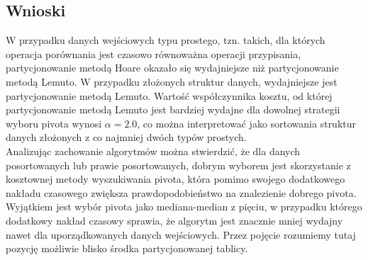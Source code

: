 \begin{figure}[]
	\centering
	
	\caption[]{}
	\label{fig:quick-sort-deterministic-pivot-reversed}
\end{figure}

\begin{figure}[]
	\centering
	
	\caption[]{}
	\label{fig:quick-sort-deterministic-pivot-cost-factor}
\end{figure}

\begin{figure}[]
	\centering
	
	\caption[]{}
	\label{fig:quick-sort-deterministic-pivot-density}
\end{figure}

\begin{figure}[]
	\centering
	
	\caption[]{}
	\label{fig:quick-sort-deterministic-pivot-all}
\end{figure}

\subsection{Wnioski}
W przypadku danych wejściowych typu prostego, tzn. takich, dla których operacja porównania jest czasowo równoważna operacji przypisania, partycjonowanie metodą Hoare okazało się wydajniejsze niż partycjonowanie metodą Lemuto. W przypadku złożonych struktur danych, wydajniejsze jest partycjonowanie metodą Lemuto. Wartość współczynnika kosztu, od której partycjonowanie metodą Lemuto jest bardziej wydajne dla dowolnej strategii wyboru pivota wynosi $\alpha = 2.0$, co można interpretować jako sortowania struktur danych złożonych z co najmniej dwóch typów prostych.\\

Analizując zachowanie algorytmów można stwierdzić, że dla danych posortowanych lub prawie posortowanych, dobrym wyborem jest skorzystanie z kosztownej metody wyszukiwania pivota, która pomimo swojego dodatkowego nakładu czasowego zwiększa prawdopodobieństwo na znalezienie dobrego pivota. Wyjątkiem jest wybór pivota jako mediana-median z pięciu, w przypadku którego dodatkowy nakład czasowy sprawia, że algorytm jest znacznie mniej wydajny nawet dla uporządkowanych danych wejściowych. Przez pojęcie  rozumiemy tutaj pozycję możliwie blisko środka partycjonowanej tablicy.\\


